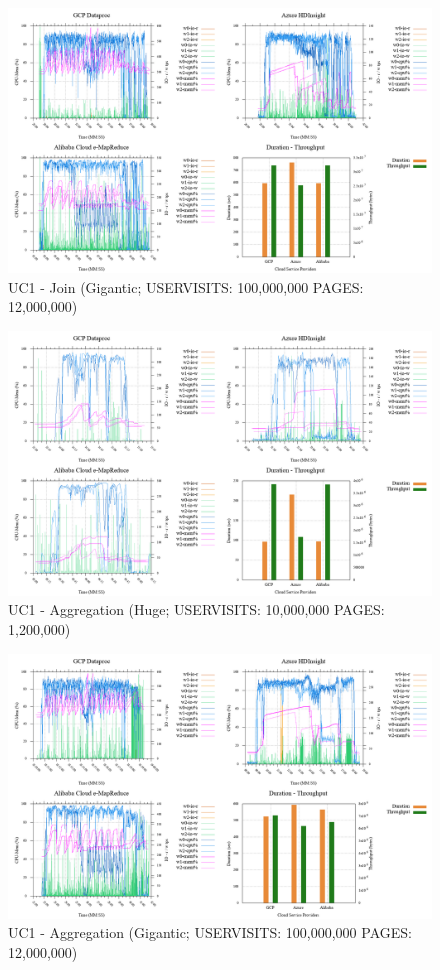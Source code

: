 \documentclass[review]{elsarticle}
\begin{document}
\begin{figure}[b]
	\caption{UC1 - Join (Gigantic; USERVISITS: 100,000,000 PAGES: 12,000,000)}
	\includegraphics[width=\textwidth]{uc1-join-g-cmidt}
	\centering
\end{figure}

\begin{figure}[b]
	\caption{UC1 - Aggregation (Huge; USERVISITS: 10,000,000 PAGES: 1,200,000)}
	\includegraphics[width=\textwidth]{uc1-aggreg-h-cmidt}
	\centering
\end{figure}

\begin{figure}[b]
	\caption{UC1 - Aggregation (Gigantic; USERVISITS: 100,000,000 PAGES: 12,000,000)}
	\includegraphics[width=\textwidth]{uc1-aggreg-g-cmidt}
	\centering
\end{figure}
\end{document}
